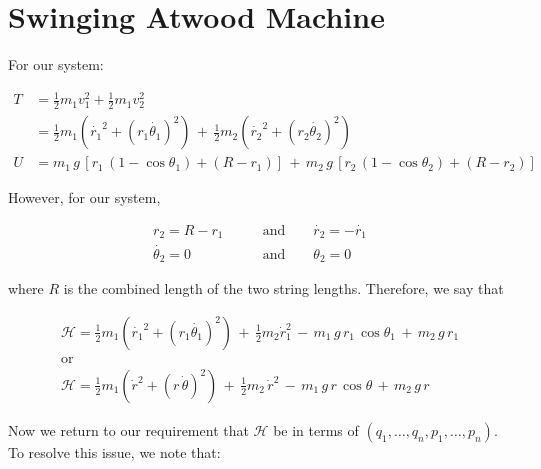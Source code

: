 \documentclass{article}
\begin{document}
\section*{Swinging Atwood Machine}

For our system:

\begin{align*}
T &= \frac{1}{2}m_{1}v_{1}^{2}+\frac{1}{2}m_{1}v_{2}^{2} \\
&= \frac{1}{2}m_{1}\left( \dot{r_{1}}^{2} + (r_{1}\dot{\theta_{1}})^{2} \right) \,+\, \frac{1}{2}m_{2}\left( \dot{r_{2}}^{2} + (r_{2}\dot{\theta_{2}})^{2} \right) \\
U &= m_{1} \, g \, \left[ r_{1} \, (1-\cos{\theta_{1}}) + (R - r_{1}) \right] \,+\, m_{2} \, g \, \left[ r_{2} \, (1-\cos{\theta_{2}}) + (R - r_{2})\right]
\end{align*}

However, for our system, 

\begin{align*}
r_{2} = R - r_{1} \qquad&\text{and}\qquad \dot{r_{2}} = -\dot{r_{1}} \\
\dot{\theta_{2}} = 0 \qquad&\text{and}\qquad \theta_{2} = 0
\end{align*}

where $R$ is the combined length of the two string lengths.  Therefore, we say that

\begin{gather*}
\mathscr{H} = \frac{1}{2}m_{1}\left( \dot{r_{1}}^{2} + (r_{1}\dot{\theta_{1}})^{2} \right) \,+\, \frac{1}{2}m_{2}\dot{r}_{1}^{2} \,-\, m_{1}\,g\,r_{1}\,\cos{\theta_{1}} \,+\, m_{2}\,g\,r_{1} \\
\text{or} \\
\mathscr{H} = \frac{1}{2}m_{1}\left( \dot{r}^{2} + (r\,\dot{\theta})^{2} \right) \,+\, \frac{1}{2}m_{2}\,\dot{r}^{2} \,-\, m_{1}\,g\,r\,\cos{\theta} \,+\, m_{2}\,g\,r
\end{gather*}

Now we return to our requirement that $\mathscr{H}$ be in terms of $(q_{1}, \ldots, q_{n}, p_{1}, \ldots, p_{n})$.  To resolve this issue, we note that:
\end{document}
